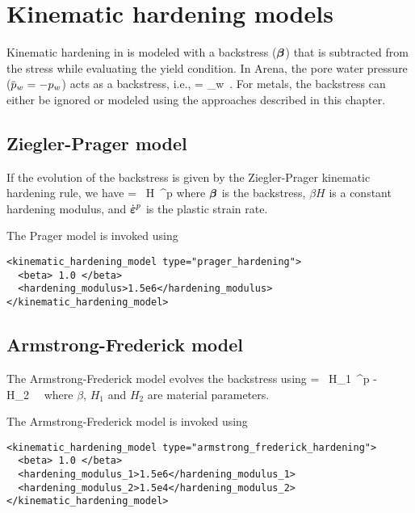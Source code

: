 \chapter{Kinematic hardening models}
Kinematic hardening in \Vaango is modeled with a backstress ($\boldsymbol{\beta}$) that is
subtracted from the stress while evaluating the yield condition.  In Arena, the
pore water pressure ($\pbar_w = -p_w$) acts as a backstress, i.e.,
\Beq
  \Bbeta = \pbar_w \BI \,.
\Eeq
For metals, the backstress can either be ignored or modeled using the approaches described
in this chapter.

\section{Ziegler-Prager model}
If the evolution of the backstress is given by the Ziegler-Prager kinematic hardening rule, we have
\Beq
  \dot{\Bbeta} = ~\beta H~\dot{\BVeps}^p 
\Eeq
where $\boldsymbol{\beta}$ is the backstress, $\beta H$ is a constant hardening modulus, and $\dot{\boldsymbol{\varepsilon}}^p$ is
the plastic strain rate.

The Prager model is invoked using
\lstset{language=XML}
\begin{lstlisting}
<kinematic_hardening_model type="prager_hardening">
  <beta> 1.0 </beta>
  <hardening_modulus>1.5e6</hardening_modulus>
</kinematic_hardening_model>
\end{lstlisting}

\section{Armstrong-Frederick model}
The Armstrong-Frederick model evolves the backstress using
\Beq
  \dot{\Bbeta} = ~\beta H_1~\dot{\BVeps}^p - \beta H_2~\Bbeta~ 
\Eeq
where $\beta$, $H_1$ and $H_2$ are material parameters.

The Armstrong-Frederick model is invoked using
\lstset{language=XML}
\begin{lstlisting}
<kinematic_hardening_model type="armstrong_frederick_hardening">
  <beta> 1.0 </beta>
  <hardening_modulus_1>1.5e6</hardening_modulus_1>
  <hardening_modulus_2>1.5e4</hardening_modulus_2>
</kinematic_hardening_model>
\end{lstlisting}

